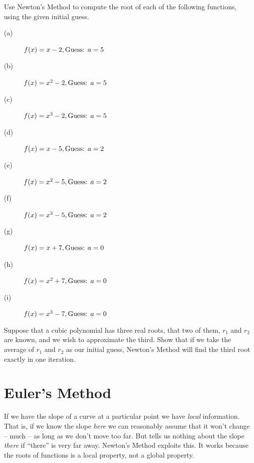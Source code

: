 \begin{ProblemSection}
  \begin{myproblem}{}
    Use Newton's Method to compute the root of each of the following
    functions, using the given initial guess. 
    \begin{multicols}{3}
      \begin{description}
      \item[(a)] $f(x)=x-2,\\ \text{Guess: } a=5$
      \item[(b)] $f(x)=x^2-2,\\ \text{Guess: } a=5$
      \item[(c)] $f(x)=x^3-2,\\ \text{Guess: } a=5$
      \item[(d)] $f(x)=x-5,\\ \text{Guess: } a=2$
      \item[(e)] $f(x)=x^2-5,\\ \text{Guess: } a=2$
      \item[(f)] $f(x)=x^3-5,\\ \text{Guess: } a=2$
      \item[(g)] $f(x)=x+7,\\ \text{Guess: } a=0$
      \item[(h)] $f(x)=x^2+7,\\ \text{Guess: } a=0$
      \item[(i)] $f(x)=x^3-7,\\ \text{Guess: } a=0$
      \end{description}

    \end{multicols}
  \end{myproblem}

  \begin{myproblem}{}
    Suppose that a cubic polynomial has three real roots, that two
    of them, $r_1$ and $r_2$ are known, and we wish to approximate the
    third. Show that if we take the average of $r_1$ and $r_2$ as our
    initial guess, Newton's Method will find the third root exactly in
    one iteration.
  \end{myproblem}
\end{ProblemSection}


\section{Euler's Method}
\label{sec:eulers-method}
If we have the slope of a curve at a particular point we have
\emph{local} information. That is, if we know the slope \emph{here} we
can reasonably assume that it won't change -- much -- as long as we
don't move too far. But tells us nothing about the slope \emph{there}
if ``there'' is very far away. Newton's Method exploits this. It works
because the roots of functions is a local property, not a global
property.

